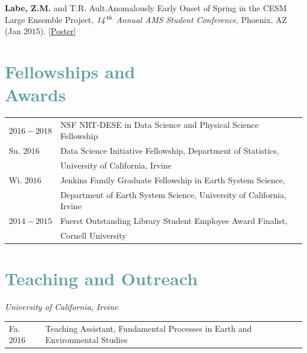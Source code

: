 \documentclass[margin,line,palatino,courier,10pt]{res}
\begin{document}
\begin{resume}
\begin{etaremune}[leftmargin=0in,topsep=0in,parsep=0in]
\item \textbf{Labe, Z.M.} and T.R. Ault.\@ Anomalously Early Onset of Spring in the CESM Large Ensemble Project, \textit{$\it{14^{th}}$ Annual AMS Student Conference}, Phoenix, AZ (Jan $2015$). \href{https://ams.confex.com/ams/95Annual/webprogram/Paper271063.html}{[Poster]} 

\end{etaremune}

\section{\sc \textcolor{CadetBlue}{\large{Fellowships and\\ Awards}}}
\vspace*{0.04in}
\begin{tabular}{@{}p{0.8in}p{4in}}
$2016-2018$ & NSF NRT-DESE in Data Science and Physical Science Fellowship\\
Su. $2016$ & Data Science Initiative Fellowship, Department of Statistics, \\
& University of California, Irvine\\
Wi. $2016$ & Jenkins Family Graduate Fellowship in Earth System Science,\\ 
& Department of Earth System
Science, University of California, Irvine\\
$2014-2015$ & Fuerst Outstanding Library Student Employee Award Finalist,\\
& Cornell University
\end{tabular}


\vspace{-0.1in}
\noindent\makebox[\linewidth][r]{\rule{\textwidth}{5pt}}
\vspace{-0.3in}

\section{\sc \textcolor{CadetBlue}{\large{Teaching and Outreach}}}

\textit{University of California, Irvine}
\vspace*{0.05in}\\
\begin{tabular}{@{}p{0.8in}p{4in}}
Fa. $2016$ & Teaching Assistant, Fundamental Processes in Earth and Environmental Studies\\
\end{tabular}


\end{resume}
\end{document}
